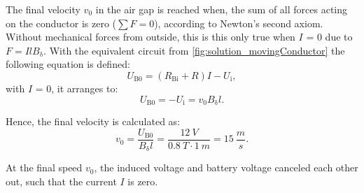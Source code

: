
\begin{solutionblock}

    The final velocity $v_{\mathrm{0}}$ in the air gap is reached when, the sum of all forces acting on the conductor is zero ($\sum F = 0$), according to Newton's second axiom.
    Without mechanical forces from outside, this is this only true when $I$ = 0 due to $F = I l B_{\updelta}$. With the equivalent circuit from \autoref{fig:solution_movingConductor} the following equation is defined:
    \begin{equation}
        U_{\mathrm{B0}} = (R_{\mathrm{Bi}} + R) I - U_{\mathrm{i}},
    \end{equation}
    with $I$ = 0, it arranges to:
    \begin{equation}
        U_{\mathrm{B0}} = - U_{\mathrm{i}}
        = v_{\mathrm{0}} B_{\updelta} l.
    \end{equation}

    Hence, the final velocity is calculated as:
    \begin{equation}
        v_{\mathrm{0}} = \frac{U_{\mathrm{B0}}}{B_{\updelta} l}
        = \frac{12 \ \si{V}}{0.8 \ \si{T} \cdot 1 \ \si{m}}
        = 15 \ \frac{\si{m}}{\si{s}}.
    \end{equation}

    At the final speed $v_{\mathrm{0}}$, the induced voltage and battery voltage canceled each other out, such that the current $I$ is zero.

\end{solutionblock}



